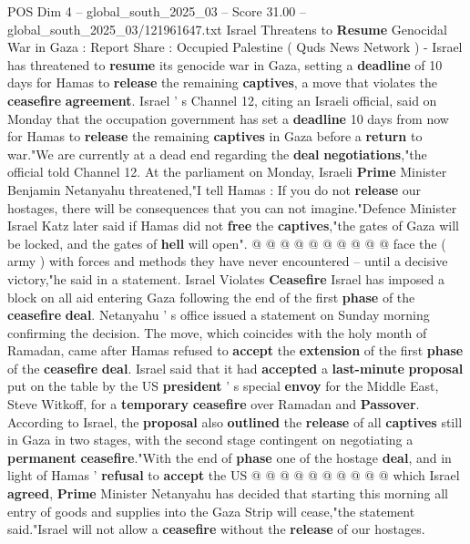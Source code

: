 \begin{textsample}{POS Dim 4 – global\_south\_2025\_03 – Score 31.00 – global\_south\_2025\_03/121961647.txt}  \label{ex:f4_pos_036}
Israel Threatens to \textbf{Resume} Genocidal War in Gaza : Report Share : Occupied Palestine ( Quds News Network ) - Israel has threatened to \textbf{resume} its genocide war in Gaza, setting a \textbf{deadline} of 10 days for Hamas to \textbf{release} the remaining \textbf{captives}, a move that violates the \textbf{ceasefire} \textbf{agreement}.
Israel ' s Channel 12, citing an Israeli official, said on Monday that the occupation government has set a \textbf{deadline} 10 days from now for Hamas to \textbf{release} the remaining \textbf{captives} in Gaza before a \textbf{return} to war."We are currently at a dead end regarding the \textbf{deal} \textbf{negotiations},"the official told Channel 12.
At the parliament on Monday, Israeli \textbf{Prime} Minister Benjamin Netanyahu threatened,"I tell Hamas : If you do not \textbf{release} our hostages, there will be consequences that you can not imagine."Defence Minister Israel Katz later said if Hamas did not \textbf{free} the \textbf{captives},"the gates of Gaza will be locked, and the gates of \textbf{hell} will open". @ @ @ @ @ @ @ @ @ @ face the ( army ) with forces and methods they have never encountered -- until a decisive victory,"he said in a statement.
Israel Violates \textbf{Ceasefire} Israel has imposed a block on all aid entering Gaza following the end of the first \textbf{phase} of the \textbf{ceasefire} \textbf{deal}.
Netanyahu ' s office issued a statement on Sunday morning confirming the decision.
The move, which coincides with the holy month of Ramadan, came after Hamas refused to \textbf{accept} the \textbf{extension} of the first \textbf{phase} of the \textbf{ceasefire} \textbf{deal}.
Israel said that it had \textbf{accepted} a \textbf{last-minute} \textbf{proposal} put on the table by the US \textbf{president} ' s special \textbf{envoy} for the Middle East, Steve Witkoff, for a \textbf{temporary} \textbf{ceasefire} over Ramadan and \textbf{Passover}.
According to Israel, the \textbf{proposal} also \textbf{outlined} the \textbf{release} of all \textbf{captives} still in Gaza in two stages, with the second stage contingent on negotiating a \textbf{permanent} \textbf{ceasefire}."With the end of \textbf{phase} one of the hostage \textbf{deal}, and in light of Hamas ' \textbf{refusal} to \textbf{accept} the US @ @ @ @ @ @ @ @ @ @ which Israel \textbf{agreed}, \textbf{Prime} Minister Netanyahu has decided that starting this morning all entry of goods and supplies into the Gaza Strip will cease,"the statement said."Israel will not allow a \textbf{ceasefire} without the \textbf{release} of our hostages.

\end{textsample}
